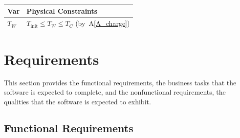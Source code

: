 \documentclass[12pt]{article}
\newcommand{\aref}[1]{A\ref{#1}}
\begin{document}
\begin{table}[!h]
\caption{Output Variables} \label{TblOutputVar}
\renewcommand{\arraystretch}{1.2}
\noindent \begin{longtable*}{l l} 
  \toprule
  \textbf{Var} & \textbf{Physical Constraints} \\
  \midrule 
  $T_W$ & $T_\text{init} \leq T_W \leq T_C$ (by~\aref{A_charge})
  \\
  \bottomrule
\end{longtable*}
\end{table}


\newpage
\section{Requirements}

This section provides the functional requirements, the business tasks that the
software is expected to complete, and the nonfunctional requirements, the
qualities that the software is expected to exhibit.

\subsection{Functional Requirements}
\end{document}
